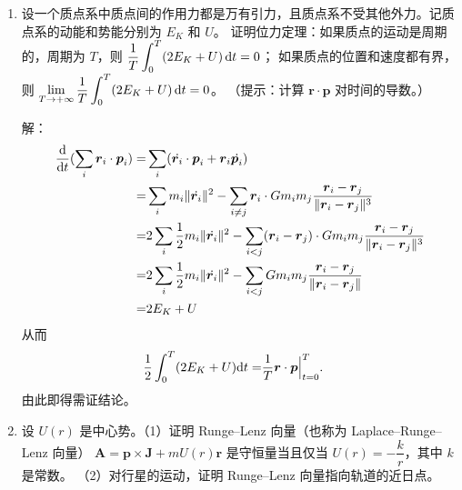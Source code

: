\begin{enumerate}
    \item 设一个质点系中质点间的作用力都是万有引力，且质点系不受其他外力。记质点系的动能和势能分别为 $E_K$ 和 $U$。
    证明位力定理：如果质点的运动是周期的，周期为 $T$，则 $\displaystyle \frac{1}{T} \int_0^T (2E_K+U) \,{\rm d}t=0$；
    如果质点的位置和速度都有界，则 $\displaystyle \lim_{T \rightarrow+\infty} \frac{1}{T} \int_0^T (2E_K+U) \,{\rm d}t=0$。
    （提示：计算 $\boldsymbol{r} \cdot \boldsymbol{p}$ 对时间的导数。）

    解：\begin{align*}
        \frac{\text{d}}{\text{d}t}(\sum_{i}\boldsymbol{r}_i\cdot \boldsymbol{p}_i)=&\sum_{i}(\dot{\boldsymbol{r}_{i}}\cdot\boldsymbol{p}_i+\boldsymbol{r}_{i}\dot{\boldsymbol{p}_{i}})\\
        =&\sum_{i}m_{i}\|\dot{\boldsymbol{r}_i}\|^2-\sum_{i \neq j}\boldsymbol{r}_{i}\cdot Gm_im_j\frac{\boldsymbol{r}_i-\boldsymbol{r}_j}{\|\boldsymbol{r}_i-\boldsymbol{r}_j\|^3}\\
        =&2\sum_{i}\frac{1}{2}m_{i}\|\dot{\boldsymbol{r}_i}\|^2-\sum_{i < j}(\boldsymbol{r}_{i}-\boldsymbol{r}_{j})\cdot Gm_im_j\frac{\boldsymbol{r}_i-\boldsymbol{r}_j}{\|\boldsymbol{r}_i-\boldsymbol{r}_j\|^3}\\
        =&2\sum_{i}\frac{1}{2}m_{i}\|\dot{\boldsymbol{r}_i}\|^2-\sum_{i < j}Gm_im_j\frac{\boldsymbol{r}_i-\boldsymbol{r}_j}{\|\boldsymbol{r}_i-\boldsymbol{r}_j\|}\\
        =&2E_K+U
    \end{align*}
    从而\begin{align*}
        \frac{1}{2}\int_0^T(2E_K+U)\text{d}t=&\frac{1}{T}\boldsymbol{r}\cdot\boldsymbol{p}\Big|_{t=0}^T. 
        \end{align*}
    由此即得需证结论。
    \item 设 $U(r)$ 是中心势。（1）证明 Runge--Lenz 向量（也称为 Laplace--Runge--Lenz 向量）
    $\boldsymbol{A}=\boldsymbol{p} \times \boldsymbol{J}+mU(r)\boldsymbol{r}$ 是守恒量当且仅当 $U(r)=-\dfrac{k}{r}$，其中 $k$ 是常数。
    （2）对行星的运动，证明 Runge--Lenz 向量指向轨道的近日点。\\


\end{enumerate}
